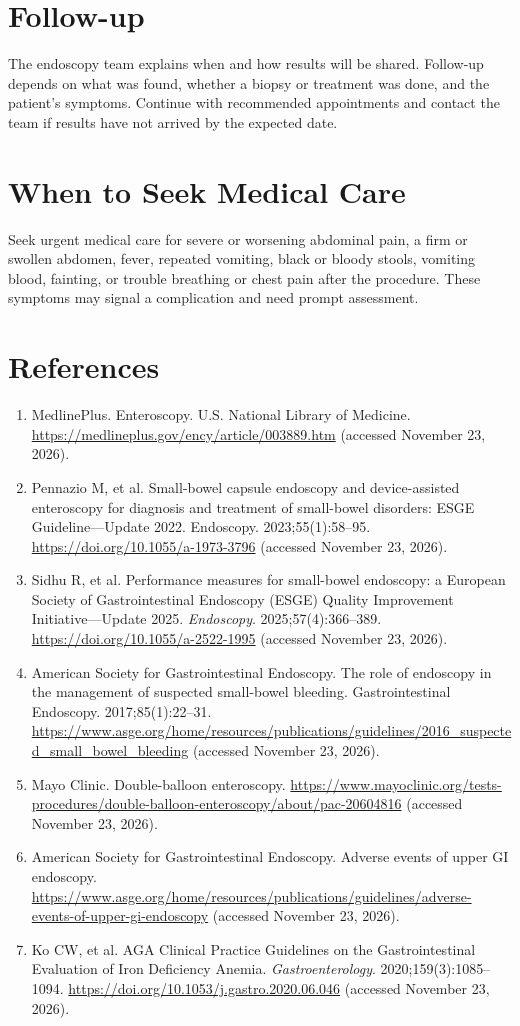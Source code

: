 \section*{Follow-up}
The endoscopy team explains when and how results will be shared. Follow-up depends on what was found, whether a biopsy or treatment was done, and the patient's symptoms. Continue with recommended appointments and contact the team if results have not arrived by the expected date.

\section*{When to Seek Medical Care}
Seek urgent medical care for severe or worsening abdominal pain, a firm or swollen abdomen, fever, repeated vomiting, black or bloody stools, vomiting blood, fainting, or trouble breathing or chest pain after the procedure. These symptoms may signal a complication and need prompt assessment.

\section*{References}
\begin{enumerate}
  \item MedlinePlus. Enteroscopy. U.S. National Library of Medicine. \url{https://medlineplus.gov/ency/article/003889.htm} (accessed November 23, 2026).
  \item Pennazio M, et al. Small-bowel capsule endoscopy and device-assisted enteroscopy for diagnosis and treatment of small-bowel disorders: ESGE Guideline—Update 2022. Endoscopy. 2023;55(1):58--95. \url{https://doi.org/10.1055/a-1973-3796} (accessed November 23, 2026).
  \item Sidhu R, et al. Performance measures for small-bowel endoscopy: a European Society of Gastrointestinal Endoscopy (ESGE) Quality Improvement Initiative—Update 2025. \textit{Endoscopy}. 2025;57(4):366--389. \url{https://doi.org/10.1055/a-2522-1995} (accessed November 23, 2026).
  \item American Society for Gastrointestinal Endoscopy. The role of endoscopy in the management of suspected small-bowel bleeding. Gastrointestinal Endoscopy. 2017;85(1):22--31. \url{https://www.asge.org/home/resources/publications/guidelines/2016_suspected_small_bowel_bleeding} (accessed November 23, 2026).
  \item Mayo Clinic. Double-balloon enteroscopy. \url{https://www.mayoclinic.org/tests-procedures/double-balloon-enteroscopy/about/pac-20604816} (accessed November 23, 2026).
  \item American Society for Gastrointestinal Endoscopy. Adverse events of upper GI endoscopy. \url{https://www.asge.org/home/resources/publications/guidelines/adverse-events-of-upper-gi-endoscopy} (accessed November 23, 2026).
  \item Ko CW, et al. AGA Clinical Practice Guidelines on the Gastrointestinal Evaluation of Iron Deficiency Anemia. \textit{Gastroenterology}. 2020;159(3):1085--1094. \url{https://doi.org/10.1053/j.gastro.2020.06.046} (accessed November 23, 2026).
\end{enumerate}
\clearpage
